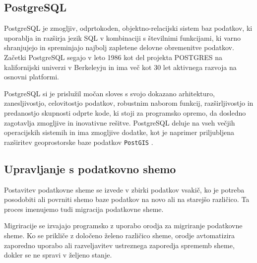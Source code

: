 \documentclass[a4paper, 12pt]{book}
\begin{document}
\subsection{PostgreSQL}
PostgreSQL je zmogljiv, odprtokoden, objektno-relacijski sistem baz podatkov, ki uporablja in razširja jezik SQL v kombinaciji s številnimi funkcijami, ki varno shranjujejo in spreminjajo najbolj zapletene delovne obremenitve podatkov. Začetki PostgreSQL segajo v leto 1986 kot del projekta POSTGRES na kalifornijski univerzi v Berkeleyju in ima več kot 30 let aktivnega razvoja na osnovni platformi.

PostgreSQL si je prislužil močan sloves s svojo dokazano arhitekturo, zanesljivostjo, celovitostjo podatkov, robustnim naborom funkcij, razširljivostjo in predanostjo skupnosti odprte kode, ki stoji za programsko opremo, da dosledno zagotavlja zmogljive in inovativne rešitve. 
PostgreSQL deluje na vseh večjih operacijskih sistemih in ima zmogljive dodatke, kot je naprimer priljubljena razširitev geoprostorske baze podatkov \verb=PostGIS= \cite{pg-database-postgis}.





\subsection{Upravljanje s podatkovno shemo}
Postavitev podatkovne sheme se izvede v zbirki podatkov vsakič, ko je potreba posodobiti ali povrniti shemo baze podatkov na novo ali na starejšo različico. Ta proces imenujemo tudi migracija podatkovne sheme.

Migriracije se izvajajo programsko z uporabo orodja za migriranje podatkovne sheme. Ko se prikliče z določeno želeno različico sheme, orodje avtomatizira zaporedno uporabo ali razveljavitev ustreznega zaporedja sprememb sheme, dokler se ne spravi v željeno stanje.
\end{document}
